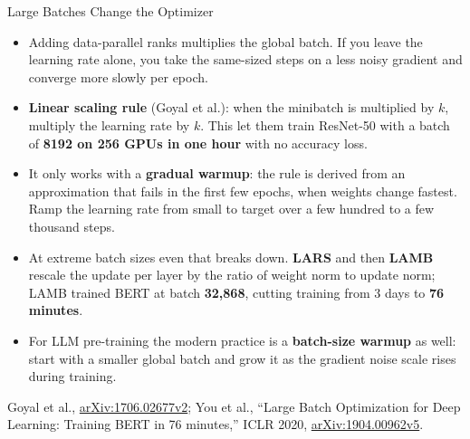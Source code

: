 \begin{frame}[allowframebreaks]{Large Batches Change the Optimizer}
  \begin{itemize}\itemsep0.4em
    \item[\textcolor{red}{$\blacktriangleright$}] Adding data-parallel ranks multiplies the global batch. If you leave the learning rate alone, you take the same-sized steps on a less noisy gradient and converge more slowly per epoch.
    \item[\textcolor{red}{$\blacktriangleright$}] \textbf{Linear scaling rule} (Goyal et al.): when the minibatch is multiplied by $k$, multiply the learning rate by $k$. This let them train ResNet-50 with a batch of \textbf{8192 on 256 GPUs in one hour} with no accuracy loss.
    \item[\textcolor{red}{$\blacktriangleright$}] It only works with a \textbf{gradual warmup}: the rule is derived from an approximation that fails in the first few epochs, when weights change fastest. Ramp the learning rate from small to target over a few hundred to a few thousand steps.
    \item[\textcolor{red}{$\blacktriangleright$}] At extreme batch sizes even that breaks down. \textbf{LARS} and then \textbf{LAMB} rescale the update per layer by the ratio of weight norm to update norm; LAMB trained BERT at batch \textbf{32{,}868}, cutting training from 3 days to \textbf{76 minutes}.
    \item[\textcolor{red}{$\blacktriangleright$}] For LLM pre-training the modern practice is a \textbf{batch-size warmup} as well: start with a smaller global batch and grow it as the gradient noise scale rises during training.
  \end{itemize}
  \vspace{0.1em}
  {\scriptsize Goyal et al., \href{https://arxiv.org/abs/1706.02677v2}{arXiv:1706.02677v2}; You et al., ``Large Batch Optimization for Deep Learning: Training BERT in 76 minutes,'' ICLR 2020, \href{https://arxiv.org/abs/1904.00962v5}{arXiv:1904.00962v5}.}
\end{frame}

